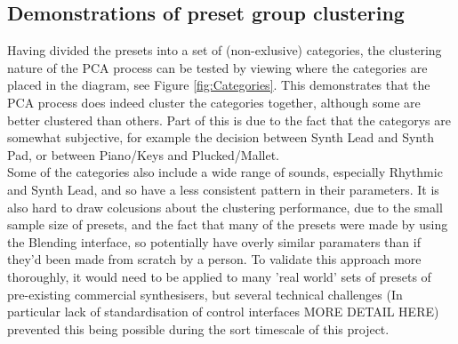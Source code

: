 \documentclass[11pt, oneside]{report}   	%
\begin{document}
\subsection{Demonstrations of preset group clustering}
Having divided the presets into a set of (non-exlusive) categories, the clustering nature of the PCA process can be tested by viewing where the categories are placed in the diagram, see Figure \ref{fig:Categories}. This demonstrates that the PCA process does indeed cluster the categories together, although some are better clustered than others. Part of this is due to the fact that the categorys are somewhat subjective, for example the decision between Synth Lead and Synth Pad, or between Piano/Keys and Plucked/Mallet.\\
Some of the categories also include a wide range of sounds, especially Rhythmic and Synth Lead, and so have a less consistent pattern in their parameters.
It is also hard to draw colcusions about the clustering performance, due to the small sample size of presets, and the fact that many of the presets were made by using the Blending interface, so potentially have overly similar paramaters than if they'd been made from scratch by a person. To validate this approach more thoroughly, it would need to be applied to many 'real world' sets of presets of pre-existing commercial synthesisers, but several technical challenges (In particular lack of standardisation of control interfaces MORE DETAIL HERE) prevented this being possible during the sort timescale of this project.
\end{document}
